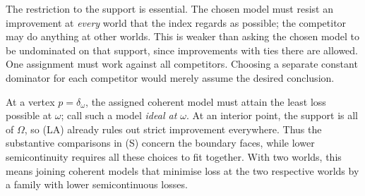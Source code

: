 \documentclass[11pt]{article}
\theoremstyle{definition}
\theoremstyle{remark}
\begin{document}
The restriction to the support is essential. The chosen model must resist an improvement at \emph{every} world that the index regards as possible; the competitor may do anything at other worlds. This is weaker than asking the chosen model to be undominated on that support, since improvements with ties there are allowed. One assignment must work against all competitors. Choosing a separate constant dominator for each competitor would merely assume the desired conclusion.

At a vertex $p=\delta_\omega$, the assigned coherent model must attain the least loss possible at $\omega$; call such a model \emph{ideal at $\omega$}. At an interior point, the support is all of $\Omega$, so (LA) already rules out strict improvement everywhere. Thus the substantive comparisons in (S) concern the boundary faces, while lower semicontinuity requires all these choices to fit together. With two worlds, this means joining coherent models that minimise loss at the two respective worlds by a family with lower semicontinuous losses.
\end{document}
